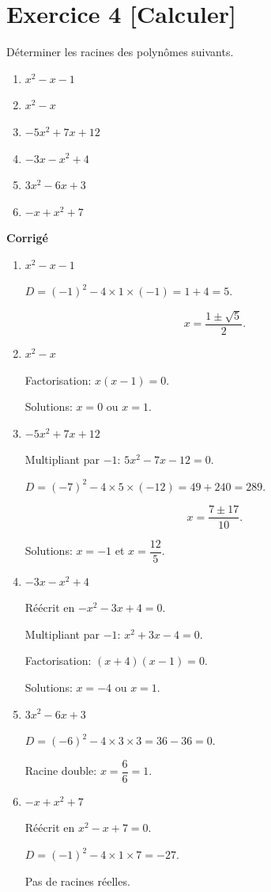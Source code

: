 \documentclass{article}
\begin{document}
\section*{Exercice 4 \textbf{[Calculer]}}

Déterminer les racines des polynômes suivants.
\begin{enumerate}
    \item $x^2 - x - 1$
    \item $x^2 - x$
    \item $-5x^2 + 7x + 12$
    \item $-3x - x^2 + 4$
    \item $3x^2 - 6x + 3$
    \item $-x + x^2 + 7$
\end{enumerate}

\textbf{Corrigé}

\begin{enumerate}
    \item $x^2 - x - 1$

    $D = (-1)^2 - 4 \times 1 \times (-1) = 1 + 4 = 5$.

    \[
    x = \dfrac{1 \pm \sqrt{5}}{2}.
    \]

    \item $x^2 - x$

    Factorisation: $x(x - 1) = 0$.

    Solutions: $x = 0$ ou $x = 1$.

    \item $-5x^2 + 7x + 12$

    Multipliant par $-1$: $5x^2 - 7x - 12 = 0$.

    $D = (-7)^2 - 4 \times 5 \times (-12) = 49 + 240 = 289$.

    \[
    x = \dfrac{7 \pm 17}{10}.
    \]

    Solutions: $x = -1$ et $x = \dfrac{12}{5}$.

    \item $-3x - x^2 + 4$

    Réécrit en $-x^2 - 3x + 4 = 0$.

    Multipliant par $-1$: $x^2 + 3x - 4 = 0$.

    Factorisation: $(x + 4)(x - 1) = 0$.

    Solutions: $x = -4$ ou $x = 1$.

    \item $3x^2 - 6x + 3$

    $D = (-6)^2 - 4 \times 3 \times 3 = 36 - 36 = 0$.

    Racine double: $x = \dfrac{6}{6} = 1$.

    \item $-x + x^2 + 7$

    Réécrit en $x^2 - x + 7 = 0$.

    $D = (-1)^2 - 4 \times 1 \times 7 = -27$.

    Pas de racines réelles.
\end{enumerate}
\end{document}
